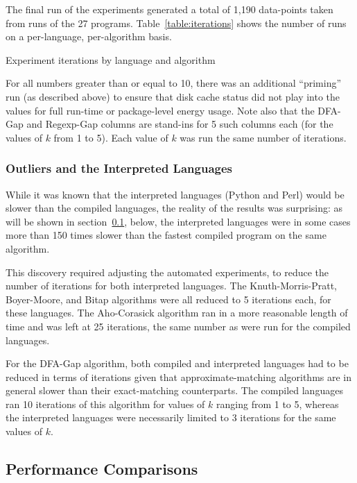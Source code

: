 The final run of the experiments generated a total of 1,190 data-points taken from runs of the 27 programs. Table~\ref{table:iterations} shows the number of runs on a per-language, per-algorithm basis.

\begin{table}[h!]
\begin{center}

\caption{Experiment iterations by language and algorithm}
\label{table:iterations}
\end{center}
\end{table}

For all numbers greater than or equal to 10, there was an additional ``priming'' run (as described above) to ensure that disk cache status did not play into the values for full run-time or package-level energy usage. Note also that the DFA-Gap and Regexp-Gap columns are stand-ins for 5 such columns each (for the values of $k$ from 1 to 5). Each value of $k$ was run the same number of iterations.

\subsubsection{Outliers and the Interpreted Languages}

While it was known that the interpreted languages (Python and Perl) would be slower than the compiled languages, the reality of the results was surprising: as will be shown in section~\ref{subsec:perf_comp}, below, the interpreted languages were in some cases more than 150 times slower than the fastest compiled program on the same algorithm.

This discovery required adjusting the automated experiments, to reduce the number of iterations for both interpreted languages. The Knuth-Morris-Pratt, Boyer-Moore, and Bitap algorithms were all reduced to 5 iterations each, for these languages. The Aho-Corasick algorithm ran in a more reasonable length of time and was left at 25 iterations, the same number as were run for the compiled languages.

For the DFA-Gap algorithm, both compiled and interpreted languages had to be reduced in terms of iterations given that approximate-matching algorithms are in general slower than their exact-matching counterparts. The compiled languages ran 10 iterations of this algorithm for values of $k$ ranging from 1 to 5, whereas the interpreted languages were necessarily limited to 3 iterations for the same values of $k$.

\subsection{Performance Comparisons}
\label{subsec:perf_comp}

